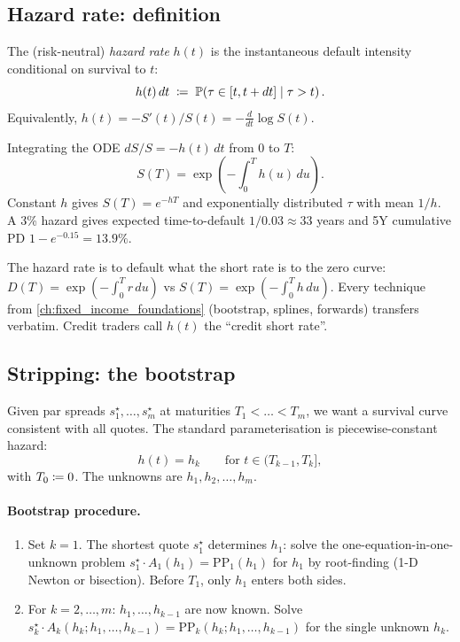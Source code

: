 \subsection{Hazard rate: definition}

\begin{definition}
The (risk-neutral) \emph{hazard rate} $h(t)$ is the instantaneous
default intensity conditional on survival to $t$:
\[
  h(t) \, dt
  \;\coloneqq\; \mathbb{P}\!\left(\tau \in [t, t+dt] \mid \tau > t\right).
\]
Equivalently, $h(t) = -S'(t)/S(t) = -\frac{d}{dt}\log S(t)$.
\end{definition}

Integrating the ODE $dS/S = -h(t)\,dt$ from $0$ to $T$:
\begin{equation}
\label{eq:survival_integral}
  S(T) = \exp\!\left(-\int_0^T h(u)\, du\right).
\end{equation}
Constant $h$ gives $S(T) = e^{-hT}$ and exponentially distributed
$\tau$ with mean $1/h$.  A 3\% hazard gives expected time-to-default
$1/0.03 \approx 33$ years and 5Y cumulative PD $1 - e^{-0.15} =
13.9\%$.

\begin{intuitionbox}
The hazard rate is to default what the short rate is to the zero
curve: $D(T) = \exp(-\int_0^T r\, du)$ vs $S(T) = \exp(-\int_0^T h\,
du)$.  Every technique from \cref{ch:fixed_income_foundations}
(bootstrap, splines, forwards) transfers verbatim.  Credit traders
call $h(t)$ the ``credit short rate''.
\end{intuitionbox}

\subsection{Stripping: the bootstrap}

Given par spreads $s_1^\star, \ldots, s_m^\star$ at maturities
$T_1 < \ldots < T_m$, we want a survival curve consistent with all
quotes.  The standard parameterisation is piecewise-constant hazard:
\[
  h(t) = h_k \qquad \text{for } t \in (T_{k-1}, T_k],
\]
with $T_0 \coloneqq 0$.  The unknowns are $h_1, h_2, \ldots, h_m$.

\paragraph{Bootstrap procedure.}
\begin{enumerate}
  \item Set $k = 1$.  The shortest quote $s_1^\star$ determines
    $h_1$: solve the one-equation-in-one-unknown problem
    $s_1^\star \cdot A_1(h_1) = \mathrm{PP}_1(h_1)$ for $h_1$ by
    root-finding (1-D Newton or bisection).  Before $T_1$, only
    $h_1$ enters both sides.
  \item For $k = 2, \ldots, m$: $h_1, \ldots, h_{k-1}$ are now
    known.  Solve
    $s_k^\star \cdot A_k(h_k; h_1, \ldots, h_{k-1})
       = \mathrm{PP}_k(h_k; h_1, \ldots, h_{k-1})$
    for the single unknown $h_k$.
\end{enumerate}

